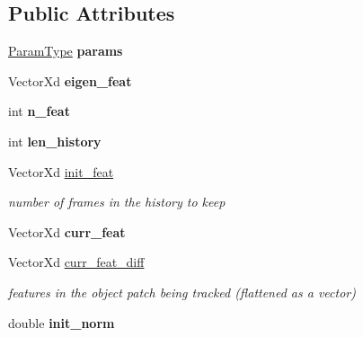 \subsection*{Public Attributes}
\begin{DoxyCompactItemize}
\item 
\hypertarget{classPCA_a0d1f1916cf9e6714bdf425c652168de2}{\hyperlink{structPCAParams}{Param\-Type} {\bfseries params}}\label{classPCA_a0d1f1916cf9e6714bdf425c652168de2}

\item 
\hypertarget{classPCA_ad4bf1ac7054517829f01b2e370a2eb4e}{Vector\-Xd {\bfseries eigen\-\_\-feat}}\label{classPCA_ad4bf1ac7054517829f01b2e370a2eb4e}

\item 
\hypertarget{classPCA_a64c2d924e1d2735945b4ad1eb5af9810}{int {\bfseries n\-\_\-feat}}\label{classPCA_a64c2d924e1d2735945b4ad1eb5af9810}

\item 
\hypertarget{classPCA_ac1d141b1932e6583ee22672aae073436}{int {\bfseries len\-\_\-history}}\label{classPCA_ac1d141b1932e6583ee22672aae073436}

\item 
\hypertarget{classPCA_adbf270d6a6b68a7f5f7f1d15a04216cb}{Vector\-Xd \hyperlink{classPCA_adbf270d6a6b68a7f5f7f1d15a04216cb}{init\-\_\-feat}}\label{classPCA_adbf270d6a6b68a7f5f7f1d15a04216cb}

\begin{DoxyCompactList}\small\item\em number of frames in the history to keep \end{DoxyCompactList}\item 
\hypertarget{classPCA_ae179e8e1e0f6dc66d072c8a45fea4b70}{Vector\-Xd {\bfseries curr\-\_\-feat}}\label{classPCA_ae179e8e1e0f6dc66d072c8a45fea4b70}

\item 
\hypertarget{classPCA_a1be871ddf989fd13dfb99c7f68236097}{Vector\-Xd \hyperlink{classPCA_a1be871ddf989fd13dfb99c7f68236097}{curr\-\_\-feat\-\_\-diff}}\label{classPCA_a1be871ddf989fd13dfb99c7f68236097}

\begin{DoxyCompactList}\small\item\em features in the object patch being tracked (flattened as a vector) \end{DoxyCompactList}\item 
\hypertarget{classPCA_a247e8f73d203a0e8df034f8f87f3f300}{double {\bfseries init\-\_\-norm}}\label{classPCA_a247e8f73d203a0e8df034f8f87f3f300}


\end{DoxyCompactItemize}
